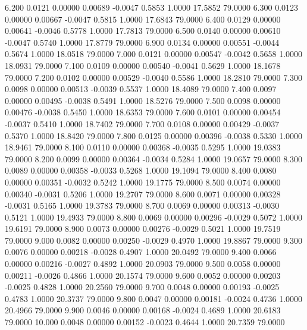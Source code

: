    6.200   0.0121   0.00000   0.00689  -0.0047   0.5853   1.0000  17.5852  79.0000
   6.300   0.0123   0.00000   0.00667  -0.0047   0.5815   1.0000  17.6843  79.0000
   6.400   0.0129   0.00000   0.00641  -0.0046   0.5778   1.0000  17.7813  79.0000
   6.500   0.0140   0.00000   0.00610  -0.0047   0.5740   1.0000  17.8779  79.0000
   6.900   0.0134   0.00000   0.00551  -0.0044   0.5674   1.0000  18.0518  79.0000
   7.000   0.0121   0.00000   0.00547  -0.0042   0.5658   1.0000  18.0931  79.0000
   7.100   0.0109   0.00000   0.00540  -0.0041   0.5629   1.0000  18.1678  79.0000
   7.200   0.0102   0.00000   0.00529  -0.0040   0.5586   1.0000  18.2810  79.0000
   7.300   0.0098   0.00000   0.00513  -0.0039   0.5537   1.0000  18.4089  79.0000
   7.400   0.0097   0.00000   0.00495  -0.0038   0.5491   1.0000  18.5276  79.0000
   7.500   0.0098   0.00000   0.00476  -0.0038   0.5450   1.0000  18.6353  79.0000
   7.600   0.0101   0.00000   0.00454  -0.0037   0.5410   1.0000  18.7402  79.0000
   7.700   0.0108   0.00000   0.00429  -0.0037   0.5370   1.0000  18.8420  79.0000
   7.800   0.0125   0.00000   0.00396  -0.0038   0.5330   1.0000  18.9461  79.0000
   8.100   0.0110   0.00000   0.00368  -0.0035   0.5295   1.0000  19.0383  79.0000
   8.200   0.0099   0.00000   0.00364  -0.0034   0.5284   1.0000  19.0657  79.0000
   8.300   0.0089   0.00000   0.00358  -0.0033   0.5268   1.0000  19.1094  79.0000
   8.400   0.0080   0.00000   0.00351  -0.0032   0.5242   1.0000  19.1775  79.0000
   8.500   0.0074   0.00000   0.00340  -0.0031   0.5206   1.0000  19.2707  79.0000
   8.600   0.0071   0.00000   0.00328  -0.0031   0.5165   1.0000  19.3783  79.0000
   8.700   0.0069   0.00000   0.00313  -0.0030   0.5121   1.0000  19.4933  79.0000
   8.800   0.0069   0.00000   0.00296  -0.0029   0.5072   1.0000  19.6191  79.0000
   8.900   0.0073   0.00000   0.00276  -0.0029   0.5021   1.0000  19.7519  79.0000
   9.000   0.0082   0.00000   0.00250  -0.0029   0.4970   1.0000  19.8867  79.0000
   9.300   0.0076   0.00000   0.00218  -0.0028   0.4907   1.0000  20.0492  79.0000
   9.400   0.0066   0.00000   0.00216  -0.0027   0.4892   1.0000  20.0903  79.0000
   9.500   0.0058   0.00000   0.00211  -0.0026   0.4866   1.0000  20.1574  79.0000
   9.600   0.0052   0.00000   0.00203  -0.0025   0.4828   1.0000  20.2560  79.0000
   9.700   0.0048   0.00000   0.00193  -0.0025   0.4783   1.0000  20.3737  79.0000
   9.800   0.0047   0.00000   0.00181  -0.0024   0.4736   1.0000  20.4966  79.0000
   9.900   0.0046   0.00000   0.00168  -0.0024   0.4689   1.0000  20.6183  79.0000
  10.000   0.0048   0.00000   0.00152  -0.0023   0.4644   1.0000  20.7359  79.0000
